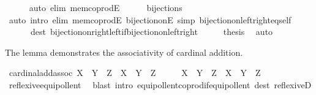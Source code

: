 \begin{isabellebody}
\ \ \ \ \isamarkupfalse%
\ {\isacharparenleft}{\kern0pt}auto\ elim{\isacharcolon}{\kern0pt}\ mem{\isacharunderscore}{\kern0pt}coprodE{\isacharparenright}{\kern0pt}\isanewline
\ \ \ \ \isamarkupfalse%
\ bijections\ \isamarkupfalse%
\ {\isacharparenleft}{\kern0pt}auto\ intro{\isacharcolon}{\kern0pt}\ elim{\isacharcolon}{\kern0pt}\ mem{\isacharunderscore}{\kern0pt}coprodE\ bijection{\isacharunderscore}{\kern0pt}onE\ simp{\isacharcolon}{\kern0pt}\ bijection{\isacharunderscore}{\kern0pt}on{\isacharunderscore}{\kern0pt}left{\isacharunderscore}{\kern0pt}right{\isacharunderscore}{\kern0pt}eq{\isacharunderscore}{\kern0pt}self\isanewline
\ \ \ \ \ \ dest{\isacharcolon}{\kern0pt}\ bijection{\isacharunderscore}{\kern0pt}on{\isacharunderscore}{\kern0pt}right{\isacharunderscore}{\kern0pt}left{\isacharunderscore}{\kern0pt}if{\isacharunderscore}{\kern0pt}bijection{\isacharunderscore}{\kern0pt}on{\isacharunderscore}{\kern0pt}left{\isacharunderscore}{\kern0pt}right{\isacharparenright}{\kern0pt}\isanewline
\ \ \isamarkupfalse%
\ \isamarkupfalse%
\ {\isacharquery}{\kern0pt}thesis\ \isamarkupfalse%
\ auto\isanewline
{}\isamarkupfalse%
%
\endisatagproof
{\isafoldproof}%
%
\isadelimproof
%
\endisadelimproof
%
\begin{isamarkuptext}%
The lemma demonstrates the associativity of cardinal addition.%
\end{isamarkuptext}\isamarkuptrue%
\isamarkupfalse%
\ cardinal{\isacharunderscore}{\kern0pt}add{\isacharunderscore}{\kern0pt}assoc{\isacharcolon}{\kern0pt}\ {\isachardoublequoteopen}{\isacharparenleft}{\kern0pt}X\ {\isasymoplus}\ Y{\isacharparenright}{\kern0pt}\ {\isasymoplus}\ Z\ {\isacharequal}{\kern0pt}\ X\ {\isasymoplus}\ {\isacharparenleft}{\kern0pt}Y\ {\isasymoplus}\ Z{\isacharparenright}{\kern0pt}{\isachardoublequoteclose}\isanewline
%
\isadelimproof
%
\endisadelimproof
%
\isatagproof
{}\isamarkupfalse%
\ {\isacharminus}{\kern0pt}\isanewline
\ \ \isamarkupfalse%
\ {\isachardoublequoteopen}{\isacharbar}{\kern0pt}{\isacharparenleft}{\kern0pt}X\ {\isasymCoprod}\ Y{\isacharparenright}{\kern0pt}{\isacharbar}{\kern0pt}\ {\isasymCoprod}\ Z\ {\isasymapprox}\ {\isacharparenleft}{\kern0pt}X\ {\isasymCoprod}\ Y{\isacharparenright}{\kern0pt}\ {\isasymCoprod}\ Z{\isachardoublequoteclose}\isanewline
\ \ \ \ \isamarkupfalse%
\ reflexive{\isacharunderscore}{\kern0pt}equipollent\ \isamarkupfalse%
\ {\isacharparenleft}{\kern0pt}blast\ intro{\isacharcolon}{\kern0pt}\ equipollent{\isacharunderscore}{\kern0pt}coprod{\isacharunderscore}{\kern0pt}if{\isacharunderscore}{\kern0pt}equipollent\ dest{\isacharcolon}{\kern0pt}\ reflexiveD{\isacharparenright}{\kern0pt}\isanewline

\end{isabellebody}

